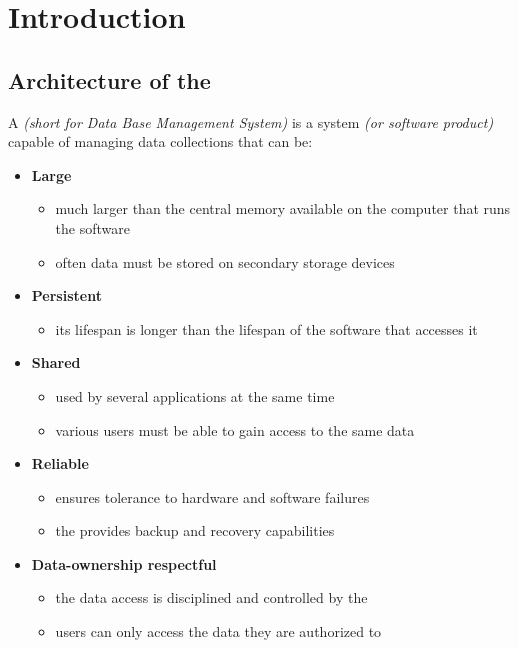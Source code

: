 \documentclass[english]{article}
\begin{document}
\makecover

\section{Introduction}

\subsection{Architecture of the \dbms}

A \textbf{\dbms} \textit{(short for Data Base Management System)} is a system \textit{(or software product)} capable of managing data collections that can be:

\begin{itemize}
  \item \textbf{Large}
        \begin{itemize}[label=\(\rightarrow\)]
          \item much larger than the central memory available on the computer that runs the software
          \item often data must be stored on secondary storage devices
        \end{itemize}
  \item \textbf{Persistent}
        \begin{itemize}[label=\(\rightarrow\)]
          \item its lifespan is longer than the lifespan of the software that accesses it
        \end{itemize}
  \item \textbf{Shared}
        \begin{itemize}[label=\(\rightarrow\)]
          \item used by several applications at the same time
          \item various users must be able to gain access to the same data
        \end{itemize}
  \item \textbf{Reliable}
        \begin{itemize}[label=\(\rightarrow\)]
          \item ensures tolerance to hardware and software failures
          \item the \dbms provides backup and recovery capabilities
        \end{itemize}
  \item \textbf{Data-ownership respectful}
        \begin{itemize}[label=\(\rightarrow\)]
          \item the data access is disciplined and controlled by the \dbms
          \item users can only access the data they are authorized to
        \end{itemize}
\end{itemize}
\end{document}
